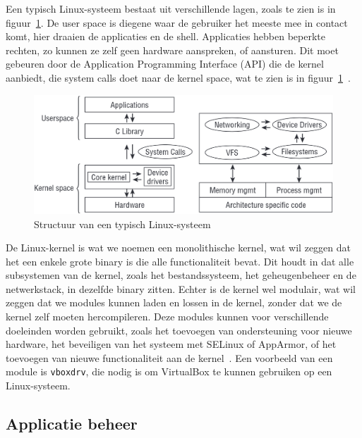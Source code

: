 Een typisch Linux-systeem bestaat uit verschillende lagen, zoals te zien is in figuur~\ref{fig:linux-system-structure}.
De user space is diegene waar de gebruiker het meeste mee in contact komt, hier draaien de applicaties en de shell.
Applicaties hebben beperkte rechten, zo kunnen ze zelf geen hardware aanspreken, of aansturen.
Dit moet gebeuren door de Application Programming Interface (API) die de kernel aanbiedt, die system calls doet naar de kernel space, wat te zien is in figuur~\ref{fig:linux-system-structure}~\autocite{mauerer2008linux}.

\begin{figure}[h!]
    \begin{center}
        \includegraphics[width=\textwidth]
        {./graphics/linux/kernel-structure.png}
        \caption{\label{fig:linux-system-structure}Structuur van een typisch Linux-systeem~\autocite{mauerer2008linux}}
    \end{center}
\end{figure}

De Linux-kernel is wat we noemen een monolithische kernel, wat wil zeggen dat het een enkele grote binary is die alle functionaliteit bevat.
Dit houdt in dat alle subsystemen van de kernel, zoals het bestandssysteem, het geheugenbeheer en de netwerkstack, in dezelfde binary zitten.
Echter is de kernel wel modulair, wat wil zeggen dat we modules kunnen laden en lossen in de kernel, zonder dat we de kernel zelf moeten hercompileren.
Deze modules kunnen voor verschillende doeleinden worden gebruikt, zoals het toevoegen van ondersteuning voor nieuwe hardware, het beveiligen van het systeem met SELinux of AppArmor, of het toevoegen van nieuwe functionaliteit aan de kernel~\autocite{hypponen2021securing}.
Een voorbeeld van een module is \texttt{vboxdrv}, die nodig is om VirtualBox te kunnen gebruiken op een Linux-systeem.

\subsection{Applicatie beheer}
\label{linux_applicatie_beheer}

